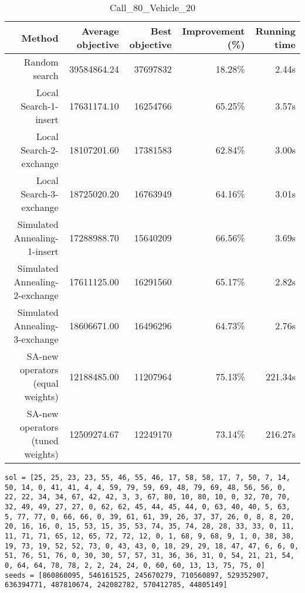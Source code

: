\begin{table}[ht]
\centering
\caption{Call\_80\_Vehicle\_20}
\label{tab:call80vehicle20}
\begin{tabular}{|r|r|r|r|r|}
Method & Average objective & Best objective & Improvement (\%) & Running time \\
\hline
Random search & 39584864.24 & 37697832 & 18.28\% & 2.44s\\
Local Search-1-insert & 17631174.10 & 16254766 & 65.25\% & 3.57s\\
Local Search-2-exchange & 18107201.60 & 17381583 & 62.84\% & 3.00s\\
Local Search-3-exchange & 18725020.20 & 16763949 & 64.16\% & 3.01s\\
Simulated Annealing-1-insert & 17288988.70 & 15640209 & 66.56\% & 3.69s\\
Simulated Annealing-2-exchange & 17611125.00 & 16291560 & 65.17\% & 2.82s\\
Simulated Annealing-3-exchange & 18606671.00 & 16496296 & 64.73\% & 2.76s\\
SA-new operators (equal weights) & 12188485.00 & 11207964 & 75.13\% & 221.34s\\
SA-new operators (tuned weights) & 12509274.67 & 12249170 & 73.14\% & 216.27s\\
\end{tabular}%
\end{table}
\begin{lstlisting}[label={lst:call80vehicle20},caption=Optimal solution call\_80\_vehicle\_20]
sol = [25, 25, 23, 23, 55, 46, 55, 46, 17, 58, 58, 17, 7, 50, 7, 14, 50, 14, 0, 41, 41, 4, 4, 59, 79, 59, 69, 48, 79, 69, 48, 56, 56, 0, 22, 22, 34, 34, 67, 42, 42, 3, 3, 67, 80, 10, 80, 10, 0, 32, 70, 70, 32, 49, 49, 27, 27, 0, 62, 62, 45, 44, 45, 44, 0, 63, 40, 40, 5, 63, 5, 77, 77, 0, 66, 66, 0, 39, 61, 61, 39, 26, 37, 37, 26, 0, 8, 8, 20, 20, 16, 16, 0, 15, 53, 15, 35, 53, 74, 35, 74, 28, 28, 33, 33, 0, 11, 11, 71, 71, 65, 12, 65, 72, 72, 12, 0, 1, 68, 9, 68, 9, 1, 0, 38, 38, 19, 73, 19, 52, 52, 73, 0, 43, 43, 0, 18, 29, 29, 18, 47, 47, 6, 6, 0, 51, 76, 51, 76, 0, 30, 30, 57, 57, 31, 36, 36, 31, 0, 54, 21, 21, 54, 0, 64, 64, 78, 78, 2, 2, 24, 24, 0, 60, 60, 13, 13, 75, 75, 0]
seeds = [860860095, 546161525, 245670279, 710560897, 529352907, 636394771, 487810674, 242082782, 570412785, 44805149]
\end{lstlisting}%
\clearpage


